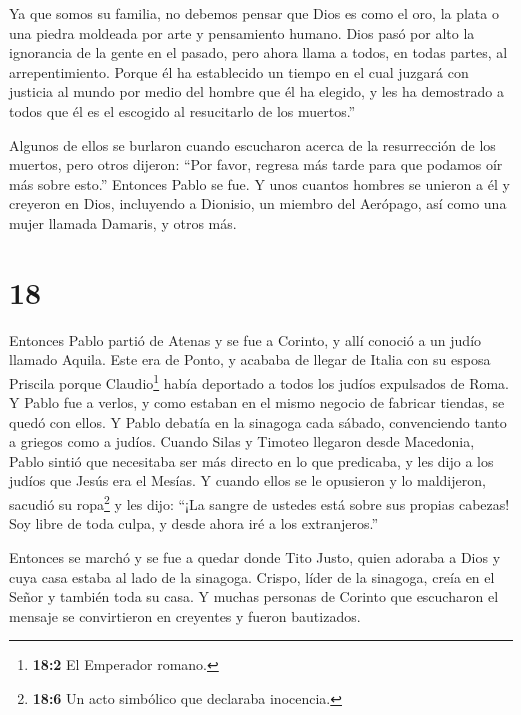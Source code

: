  Ya que somos su familia, no debemos pensar que Dios es
como el oro, la plata o una piedra moldeada por arte y pensamiento
humano.  Dios pasó por alto la ignorancia de la gente en el
pasado, pero ahora llama a todos, en todas partes, al arrepentimiento.
 Porque él ha establecido un tiempo en el cual juzgará con
justicia al mundo por medio del hombre que él ha elegido, y les ha
demostrado a todos que él es el escogido al resucitarlo de los
muertos.''

 Algunos de ellos se burlaron cuando escucharon acerca de
la resurrección de los muertos, pero otros dijeron: ``Por favor, regresa
más tarde para que podamos oír más sobre esto.''  Entonces
Pablo se fue.  Y unos cuantos hombres se unieron a él y
creyeron en Dios, incluyendo a Dionisio, un miembro del Aerópago, así
como una mujer llamada Damaris, y otros más.

\hypertarget{section-17}{%
\section{18}\label{section-17}}

 Entonces Pablo partió de Atenas y se fue a Corinto,
 y allí conoció a un judío llamado Aquila. Este era de
Ponto, y acababa de llegar de Italia con su esposa Priscila porque
Claudio\footnote{\textbf{18:2} El Emperador romano.} había deportado a
todos los judíos expulsados de Roma. Y Pablo fue a verlos, 
y como estaban en el mismo negocio de fabricar tiendas, se quedó con
ellos.  Y Pablo debatía en la sinagoga cada sábado,
convenciendo tanto a griegos como a judíos.  Cuando Silas y
Timoteo llegaron desde Macedonia, Pablo sintió que necesitaba ser más
directo en lo que predicaba, y les dijo a los judíos que Jesús era el
Mesías.  Y cuando ellos se le opusieron y lo maldijeron,
sacudió su ropa\footnote{\textbf{18:6} Un acto simbólico que declaraba
  inocencia.} y les dijo: ``¡La sangre de ustedes está sobre sus propias
cabezas! Soy libre de toda culpa, y desde ahora iré a los extranjeros.''

 Entonces se marchó y se fue a quedar donde Tito Justo,
quien adoraba a Dios y cuya casa estaba al lado de la sinagoga.
 Crispo, líder de la sinagoga, creía en el Señor y también
toda su casa. Y muchas personas de Corinto que escucharon el mensaje se
convirtieron en creyentes y fueron bautizados.

